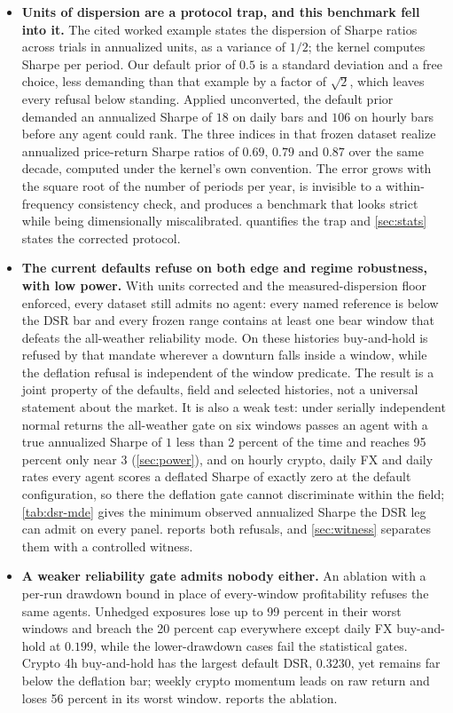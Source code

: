 \begin{itemize}[leftmargin=*,itemsep=2pt]
\item \textbf{Units of dispersion are a protocol trap, and this benchmark fell into it.} The cited worked example states the dispersion of Sharpe ratios across trials in annualized units, as a variance of $1/2$; the kernel computes Sharpe per period. Our default prior of $0.5$ is a standard deviation and a free choice, less demanding than that example by a factor of $\sqrt{2}$, which leaves every refusal below standing. Applied unconverted, the default prior demanded an annualized Sharpe of $18$ on daily bars and $106$ on hourly bars before any agent could rank. The three indices in that frozen dataset realize annualized price-return Sharpe ratios of $0.69$, $0.79$ and $0.87$ over the same decade, computed under the kernel's own convention. The error grows with the square root of the number of periods per year, is invisible to a within-frequency consistency check, and produces a benchmark that looks strict while being dimensionally miscalibrated.  quantifies the trap and \cref{sec:stats} states the corrected protocol.
\item \textbf{The current defaults refuse on both edge and regime robustness, with low power.} With units corrected and the measured-dispersion floor enforced, every dataset still admits no agent: every named reference is below the DSR bar and every frozen range contains at least one bear window that defeats the all-weather reliability mode. On these histories buy-and-hold is refused by that mandate wherever a downturn falls inside a window, while the deflation refusal is independent of the window predicate. The result is a joint property of the defaults, field and selected histories, not a universal statement about the market. It is also a weak test: under serially independent normal returns the all-weather gate on six windows passes an agent with a true annualized Sharpe of $1$ less than 2 percent of the time and reaches 95 percent only near $3$ (\cref{sec:power}), and on hourly crypto, daily FX and daily rates every agent scores a deflated Sharpe of exactly zero at the default configuration, so there the deflation gate cannot discriminate within the field; \cref{tab:dsr-mde} gives the minimum observed annualized Sharpe the DSR leg can admit on every panel.  reports both refusals, and \cref{sec:witness} separates them with a controlled witness.
\item \textbf{A weaker reliability gate admits nobody either.} An ablation with a per-run drawdown bound in place of every-window profitability refuses the same agents. Unhedged exposures lose up to 99 percent in their worst windows and breach the 20 percent cap everywhere except daily FX buy-and-hold at $0.199$, while the lower-drawdown cases fail the statistical gates. Crypto 4h buy-and-hold has the largest default DSR, $0.3230$, yet remains far below the deflation bar; weekly crypto momentum leads on raw return and loses 56 percent in its worst window.  reports the ablation.

\end{itemize}
